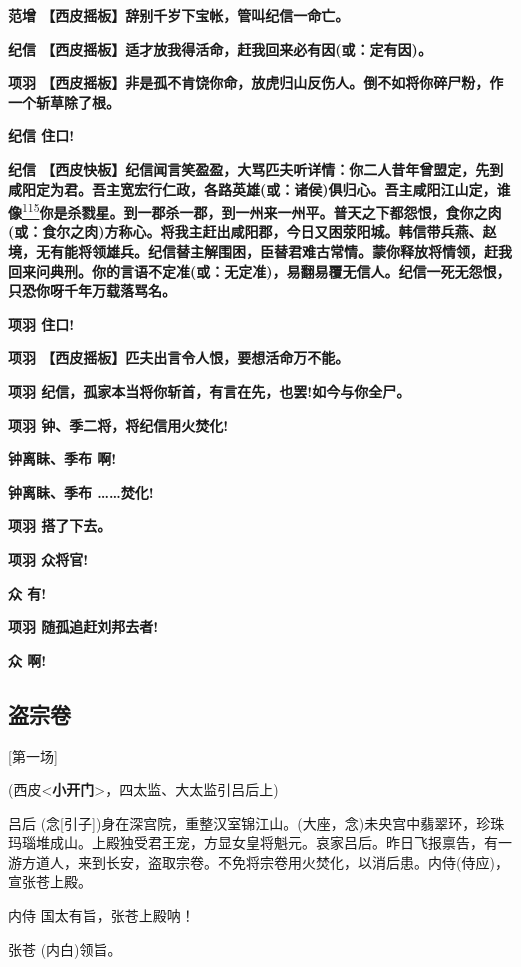 \textbf{范增 【西皮摇板】辞别千岁下宝帐，管叫纪信一命亡。}

\textbf{纪信 【西皮摇板】适才放我得活命，赶我回来必有因(或：定有因)。}

\textbf{项羽
【西皮摇板】非是孤不肯饶你命，放虎归山反伤人。倒不如将你碎尸粉，作一个斩草除了根。}

\textbf{纪信 住口!}

\textbf{纪信
【西皮快板】纪信闻言笑盈盈，大骂匹夫听详情：你二人昔年曾盟定，先到咸阳定为君。吾主宽宏行仁政，各路英雄(或：诸侯)俱归心。吾主咸阳江山定，谁像}\protect\hyperlink{fn115}{\textsuperscript{115}}\textbf{你是杀戮星。到一郡杀一郡，到一州来一州平。普天之下都怨恨，食你之肉(或：食尔之肉)方称心。将我主赶出咸阳郡，今日又困荥阳城。韩信带兵燕、赵境，无有能将领雄兵。纪信替主解围困，臣替君难古常情。蒙你释放将情领，赶我回来问典刑。你的言语不定准(或：无定准)，易翻易覆无信人。纪信一死无怨恨，只恐你呀千年万载落骂名。}

\textbf{项羽 住口!}

\textbf{项羽 【西皮摇板】匹夫出言令人恨，要想活命万不能。}

\textbf{项羽 纪信，孤家本当将你斩首，有言在先，也罢!如今与你全尸。}

\textbf{项羽 钟、季二将，将纪信用火焚化!}

\textbf{钟离眛、季布 啊!}

\textbf{钟离眛、季布 \ldots{}\ldots{}焚化!}

\textbf{项羽 搭了下去。}

\textbf{项羽 众将官!}

\textbf{众 有!}

\textbf{项羽 随孤追赶刘邦去者!}

\textbf{众 啊!}

\newpage
\hypertarget{ux76d7ux5b97ux5377}{%
\subsection{盗宗卷}\label{ux76d7ux5b97ux5377}}

{[}第一场{]}

(西皮\textless{}\textbf{小开门}\textgreater{}，四太监、大太监引吕后上)

吕后
(念{[}引子{]})身在深宫院，重整汉室锦江山。(大座，念)未央宫中翡翠环，珍珠玛瑙堆成山。上殿独受君王宠，方显女皇将魁元。哀家吕后。昨日飞报禀告，有一游方道人，来到长安，盗取宗卷。不免将宗卷用火焚化，以消后患。内侍(侍应)，宣张苍上殿。

内侍 国太有旨，张苍上殿呐！

张苍 (内白)领旨。

